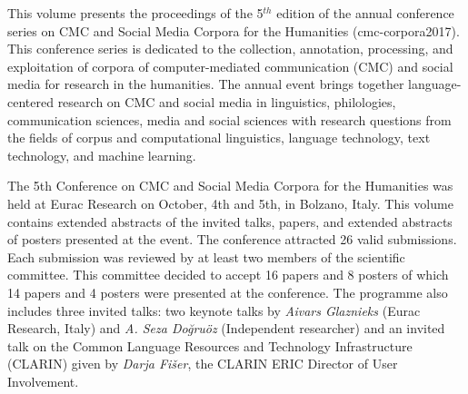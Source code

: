 \documentclass[a4paper, onesided]{easychair}
\title{\thetitle}
\institute{%
    \institutea
\and%
    \instituteb
}
\begin{document}




\title{\thetitle}
%
\author{\authora{} \and \authorb{}}

\clearpage
\maketitle

\bigskip

{}
This volume presents the proceedings of the 5{$^{th}$} edition of the annual conference series on CMC and Social Media Corpora for the Humanities (cmc-corpora2017). This conference series is dedicated to the collection, annotation, processing, and exploitation of corpora of computer-mediated communication (CMC) and social media for research in the humanities. The annual event brings together language-centered research on CMC and social media in linguistics, philologies, communication sciences, media and social sciences with research questions from the fields of corpus and computational linguistics, language technology, text technology, and machine learning.

The 5th Conference on CMC and Social Media Corpora for the Humanities was held at Eurac Research on October, 4th and 5th, in Bolzano, Italy. This volume contains extended abstracts of the invited talks, papers, and extended abstracts of posters presented at the event. The conference attracted 26 valid submissions. Each submission was reviewed by at least two members of the scientific committee. This committee decided to accept 16 papers and 8 posters of which 14 papers and 4 posters were presented at the conference. The programme also includes three invited talks: two keynote talks by \textit{Aivars Glaznieks} (Eurac Research, Italy) and \textit{A. Seza Do\u{g}ru\"oz} (Independent researcher) and an invited talk on the Common Language Resources and Technology Infrastructure (CLARIN) given by \textit{Darja Fi\v{s}er}, the CLARIN ERIC Director of User Involvement.
\end{document}
